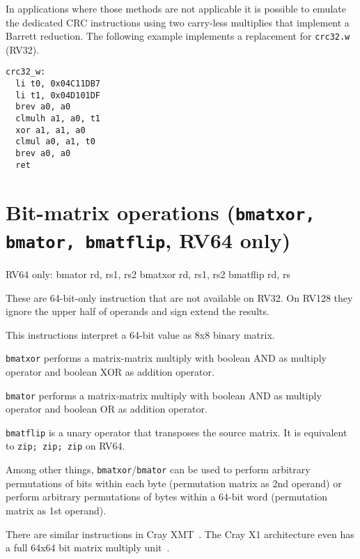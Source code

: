 In applications where those methods are not applicable it is possible to emulate the dedicated CRC
instructions using two carry-less multiplies that implement a Barrett reduction. The following example
implements a replacement for \texttt{crc32.w} (RV32).

\begin{minipage}{\linewidth}
\begin{verbatim}
crc32_w:
  li t0, 0x04C11DB7
  li t1, 0x04D101DF
  brev a0, a0
  clmulh a1, a0, t1
  xor a1, a1, a0
  clmul a0, a1, t0
  brev a0, a0
  ret
\end{verbatim}
\end{minipage}


\section{Bit-matrix operations (\texttt{bmatxor, bmator, bmatflip}, RV64 only)}

\begin{rvb}
  RV64 only:
    bmator rd, rs1, rs2
    bmatxor rd, rs1, rs2
    bmatflip rd, rs
\end{rvb}

These are 64-bit-only instruction that are not available on RV32. On RV128 they
ignore the upper half of operands and sign extend the results.

This instructions interpret a 64-bit value as 8x8 binary matrix.

\texttt{bmatxor} performs a matrix-matrix multiply with boolean AND as multiply
operator and boolean XOR as addition operator.

\texttt{bmator} performs a matrix-matrix multiply with boolean AND as multiply
operator and boolean OR as addition operator.

\texttt{bmatflip} is a unary operator that transposes the source matrix. It is
equivalent to \texttt{zip; zip; zip} on RV64.

Among other things, \texttt{bmatxor}/\texttt{bmator} can be used to perform
arbitrary permutations of bits within each byte (permutation matrix as 2nd
operand) or perform arbitrary permutations of bytes within a 64-bit word
(permutation matrix as 1st operand).

There are similar instructions in Cray XMT~\cite{CrayXMT}. The Cray X1
architecture even has a full 64x64 bit matrix multiply unit~\cite{CrayX1}.

